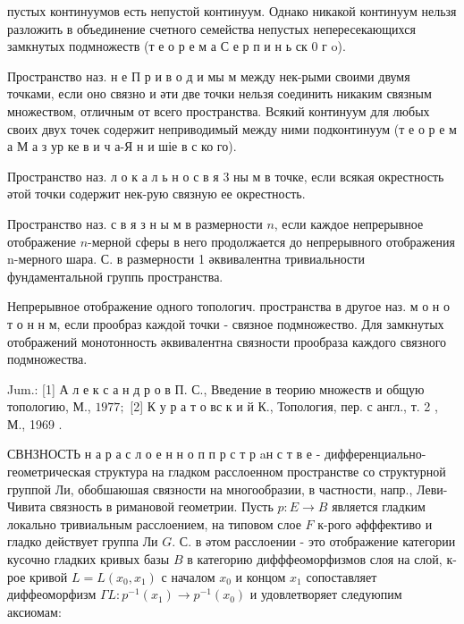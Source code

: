 \documentclass[10pt]{article}
\begin{document}
пустых континуумов есть непустой континуум. Однако никакой континуум нельзя разложить в объединение счетного семейства непустых непересекающихся замкнутых подмножеств (т е о р е м а С е р п и н ь ск 0 г o).



Пространство наз. н е П р и в о д и мы м между нек-рыми своими двумя точками, если оно связно и әти две точки нельзя соединить никаким связным множеством, отличным от всего пространства. Всякий континуум для любых своих двух точек содержит неприводимый между ними подконтинуум (т е о р е м а М а з ур ке в и ч а-Я н и шіе в с ко го).



Пространство наз. л о к а л ь н о с в я 3 ны м в точке, если всякая окрестность әтой точки содержит нек-рую связную ее окрестность.



Пространство наз. с в я з н ы м в размерности $n$, если каждое непрерывное отображение $n$-мерной сферы в него продолжается до непрерывного отображения n-мерного шара. С. в размерности 1 әквивалентна тривиальности фундаментальной группь пространства.



Непрерывное отображение одного топологич. пространства в другое наз. м о н о т о н н м, если прообраз каждой точки - связное подмножество. Для замкнутых отображений монотонность әквивалентна связности прообраза каждого связного подмножества.



Jum.: [1] А л е к с а н д р о в П. С., Введение в теорию множеств и общую топологию, М., $1977 ;$ [2] К у р а т о вс к и й К., Топология, пер. с англ., т. 2 , М., 1969 .



СВНЗНОСТЬ н а р а с л о е н н о п п р с т р aн с т в е - дифференциально-геометрическая структура на гладком расслоенном пространстве со структурной группой Ли, обобшаюшая связности на многообразии, в частности, напр., Леви-Чивита связность в римановой геометрии. Пусть $p: E \rightarrow B$ является гладким локально тривиальным расслоением, на типовом слое $F$ к-рого әфффективо и гладко действует группа Ли $G$. С. в әтом расслоении - это отображение категории кусочно гладких кривых базы $B$ в категорию дифффеоморфизмов слоя на слой, к-рое кривой $L=L\left(x_{0}, x_{1}\right)$ с началом $x_{0}$ и концом $x_{1}$ сопоставляет диффеоморфизм $\Gamma L: p^{-1}\left(x_{1}\right) \rightarrow p^{-1}\left(x_{0}\right)$ и удовлетворяет следуюпим аксиомам:
\end{document}
